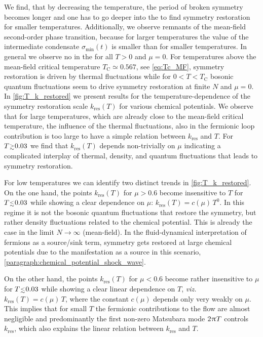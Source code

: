 		
	We find, that by decreasing the temperature, the \rgtime{} period of broken \ZII{} symmetry becomes longer and one has to go deeper into the \ir{} to find symmetry restoration for smaller temperatures. Additionally, we observe remnants of the mean-field second-order phase transition, because for larger temperatures the value of the intermediate condensate $\sigma_\mathrm{min} ( t )$ is smaller than for smaller temperatures. In general we observe no \ssb{} in the \ir{} for all $T>0$ and $\mu=0$. For temperatures above the mean-field critical temperature $T_\mathrm{C}\simeq  0.567$, see \cref{eq:Tc_MF}, symmetry restoration is driven by thermal fluctuations while for $0 < T < T_\mathrm{C}$ bosonic quantum fluctuations seem to drive symmetry restoration at finite $N$ and $\mu = 0$.\\	

	In \cref{fig:T_k_restored} we present results for the temperature-dependence of the symmetry restoration scale $k_\mathrm{res} ( T )$ for various chemical potentials.  We observe that for large temperatures, which are already close to the mean-field critical temperature, the influence of the thermal fluctuations, also in the fermionic loop contribution is too large to have a simple relation between $k_\mathrm{res}$ and $T$. For $T\smallergtrsim 0.03$ we find that $k_\mathrm{res} ( T )$ depends non-trivially on $\mu$ indicating a complicated interplay of thermal, density, and quantum fluctuations that leads to symmetry restoration.
	
	For low temperatures we can identify two distinct trends in \cref{fig:T_k_restored}. On the one hand, the points $k_\mathrm{res} ( T )$ for $\mu>0.6$ become insensitive to $T$ for $T \smallerlesssim 0.03$ while showing a clear dependence on $\mu$: $k_\mathrm{res} ( T ) = c ( \mu ) \, T^0$. In this regime it is not the bosonic quantum fluctuations that restore the symmetry, but rather density fluctuations related to the chemical potential. This is already the case in the limit $N \rightarrow \infty$ (mean-field). In the fluid-dynamical interpretation of fermions as a source/sink term, symmetry gets restored at large chemical potentials due to the manifestation as a source in this scenario, \cf{} \cref{paragraph:chemical_potential_shock_wave}.
	
	On the other hand, the points $k_\mathrm{res} ( T )$ for $\mu < 0.6$ become rather insensitive to $\mu$ for $T \smallerlesssim 0.03$ while showing a clear linear dependence on $T$, \textit{viz.} $k_\mathrm{res} ( T ) = c ( \mu ) \, T$, where the constant $c(\mu)$ depends only very weakly on $\mu$. This implies that for small $T$ the fermionic contributions to the flow are almost negligible and predominantly the first non-zero Matsubara mode $2 \mkern1.0mu\uppi\mkern1.0mu  T$ controls $k_\mathrm{res}$, which also explains the linear relation between $k_\mathrm{res}$ and $T$.
	

